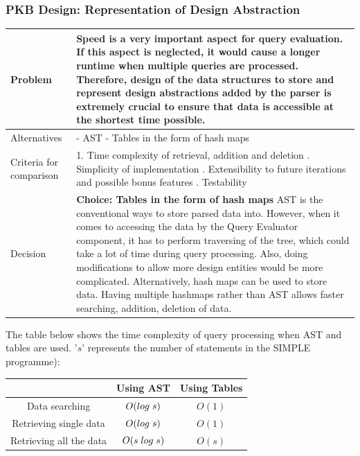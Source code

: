 \documentclass[12pt]{article}
\begin{document}
{{{{{{{{{{\subsubsection{PKB Design: Representation of Design Abstraction}
\begin{tabular}{|L{5cm} | L{12cm}| }
\hline
Problem &
Speed is a very important aspect for query evaluation. If this aspect is neglected, it would cause a longer runtime when multiple queries are processed. Therefore, design of the data structures to store and represent design abstractions added by the parser is extremely crucial to ensure that data is accessible at the shortest time possible.
 \\
    \hline
    Alternatives &
- AST
\newline - Tables in the form of hash maps
 \\
\hline
    Criteria for comparison &
1. Time complexity of retrieval, addition and deletion
. Simplicity of implementation 
. Extensibility to future iterations and possible bonus features
. Testability
 \\
 \hline
   Decision & \textbf{Choice: Tables in the form of hash maps}
\newline
AST is the conventional ways to store parsed data into. However, when it comes to accessing the data by the Query Evaluator component, it has to perform traversing of the tree, which could take a lot of time during query processing. Also, doing modifications to allow more design entities would be more complicated. Alternatively, hash maps can be used to store data. Having multiple hashmaps rather than AST allows faster searching, addition, deletion of data. 
 \\
 \hline
\end{tabular}
\vspace{5mm}
The table below shows the time complexity of query processing when AST and tables are used. '$s$' represents the number of statements in the SIMPLE programme):
\begin{table}[htbp]
\begin{tabular}{|c|c|c|}
\hline
 & Using AST & Using Tables\\
\hline
Data searching & $O(log\hspace{1mm}s)$& $O(1)$\\
\hline
Retrieving single data & $O(log\hspace{1mm}s)$& $O(1)$ \\
\hline
Retrieving all the data & $O(s\hspace{1mm}log\hspace{1mm}s)$ & $O(s)$\\
\hline
\end{tabular}
\end{table}
}}}}}}}}}}
\end{document}
